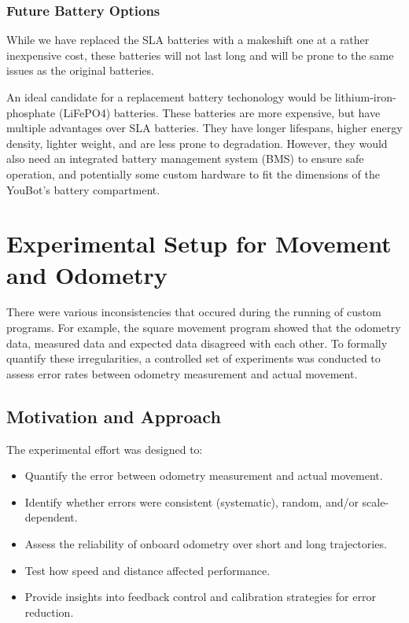 \documentclass[a4paper, 12pt]{article}
\begin{document}
    \subsubsection{Future Battery Options}

    While we have replaced the SLA batteries with a makeshift one at a rather inexpensive cost, these batteries will not last long and will be prone to the same issues as the original batteries. 

    An ideal candidate for a replacement battery techonology would be lithium-iron-phosphate (LiFePO4) batteries. These batteries are more expensive, but have multiple advantages over SLA batteries. They have longer lifespans, higher energy density, lighter weight, and are less prone to degradation. However, they would also need an integrated battery management system (BMS) to ensure safe operation, and potentially some custom hardware to fit the dimensions of the YouBot's battery compartment. 

    \pagebreak
    
    \section{Experimental Setup for Movement and Odometry}

    There were various inconsistencies that occured during the running of custom programs. For example, the square movement program showed that the odometry data, measured data and expected data disagreed with each other. To formally quantify these irregularities, a controlled set of experiments was conducted to assess error rates between odometry measurement and actual movement.

    \subsection{Motivation and Approach}

    The experimental effort was designed to:
    \begin{itemize}[noitemsep]
        \item Quantify the error between odometry measurement and actual movement.
        \item Identify whether errors were consistent (systematic), random, and/or scale-dependent.
        \item Assess the reliability of onboard odometry over short and long trajectories.
        \item Test how speed and distance affected performance.
        \item Provide insights into feedback control and calibration strategies for error reduction.
    \end{itemize}
\end{document}
